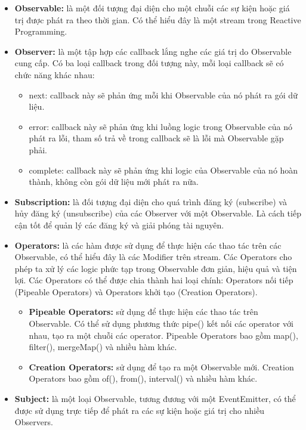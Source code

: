 \begin{itemize}
  \item \textbf{Observable:} là một đối tượng đại diện cho một chuỗi các sự kiện hoặc giá trị được phát ra theo thời gian.  Có thể hiểu đây là một stream trong Reactive Programming.
  \item \textbf{Observer:} là một tập hợp các callback lắng nghe các giá trị do Observable cung cấp.
  Có ba loại callback trong đối tượng này, mỗi loại callback sẽ có chức năng khác nhau:
  \begin{itemize}
    \item next: callback này sẽ phản ứng mỗi khi Observable của nó phát ra gói dữ liệu.
    \item error: callback này sẽ phản ứng khi luồng logic trong Observable của nó phát ra lỗi, tham số trả về trong callback sẽ là lỗi mà Observable gặp phải.
    \item complete: callback này sẽ phản ứng khi logic của Observable của nó hoàn thành, không còn gói dữ liệu mới phát ra nữa.
  \end{itemize}
  \item \textbf{Subscription:} là đối tượng đại diện cho quá trình đăng ký (subscribe) và hủy đăng ký (unsubscribe) của các Observer với một Observable.
  Là cách tiếp cận tốt để quản lý các đăng ký và giải phóng tài nguyên.
  \item \textbf{Operators:} là các hàm được sử dụng để thực hiện các thao tác trên các Observable, có thể hiểu đây là các Modifier trên stream.
  Các Operators cho phép ta xử lý các logic phức tạp trong Observable đơn giản, hiệu quả và tiện lợi.
  Các Operators có thể được chia thành hai loại chính: Operators nối tiếp (Pipeable Operators) và Operators khởi tạo (Creation Operators).
  \begin{itemize}
    \item \textbf{Pipeable Operators:} sử dụng để thực hiện các thao tác trên Observable.
    Có thể sử dụng phương thức pipe() kết nối các operator với nhau, tạo ra một chuỗi các operator.
    Pipeable Operators bao gồm map(), filter(), mergeMap() và nhiều hàm khác.
    \item \textbf{Creation Operators:} sử dụng để tạo ra một Observable mới.
    Creation Operators bao gồm of(), from(), interval() và nhiều hàm khác.
  \end{itemize}
  \item \textbf{Subject:} là một loại Observable, tương đương với một EventEmitter, có thể được sử dụng trực tiếp để phát ra các sự kiện hoặc giá trị cho nhiều Observers.

\end{itemize}
